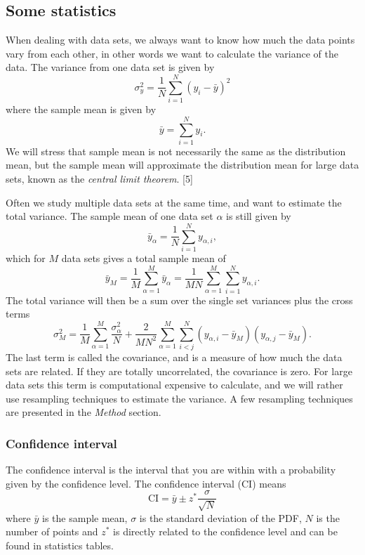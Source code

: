 \subsection{Some statistics} \label{sec:statistics}
When dealing with data sets, we always want to know how much the data points vary from each other, in other words we want to calculate the variance of the data. The variance from one data set is given by 
\begin{equation}
\sigma_y^2=\frac{1}{N}\sum_{i=1}^N(y_i-\bar{y})^2
\end{equation}
where the sample mean is given by
\begin{equation}
\bar{y}=\sum_{i=1}^Ny_i.
\end{equation}
We will stress that sample mean is not necessarily the same as the distribution mean, but the sample mean will approximate the distribution mean for large data sets, known as the \textit{central limit theorem}. [5]

Often we study multiple data sets at the same time, and want to estimate the total variance. The sample mean of one data set $\alpha$ is still given by
\begin{equation}
\bar{y}_{\alpha}=\frac{1}{N}\sum_{i=1}^Ny_{\alpha,i},
\end{equation}
which for $M$ data sets gives a total sample mean of
\begin{equation}
\bar{y}_M=\frac{1}{M}\sum_{\alpha=1}^M\bar{y}_{\alpha}=\frac{1}{MN}\sum_{\alpha=1}^M\sum_{i=1}^Ny_{\alpha,i}.
\end{equation}
The total variance will then be a sum over the single set variances plus the cross terms
\begin{equation}
\sigma_M^2=\frac{1}{M}\sum_{\alpha=1}^M\frac{\sigma_{\alpha}^2}{N}+\frac{2}{MN^2}\sum_{\alpha=1}^M\sum_{i<j}^N(y_{\alpha,i}-\bar{y}_M)(y_{\alpha,j}-\bar{y}_M).
\end{equation}
The last term is called the covariance, and is a measure of how much the data sets are related. If they are totally uncorrelated, the covariance is zero. For large data sets this term is computational expensive to calculate, and we will rather use resampling techniques to estimate the variance. A few resampling techniques are presented in the \textit{Method} section.

\subsubsection{Confidence interval} \label{sec:confidence}
The confidence interval is the interval that you are within with a probability given by the confidence level. The confidence interval (CI) means
\begin{equation}
\text{CI}=\bar{y}\pm z^*\frac{\sigma}{\sqrt{N}}
\end{equation}
where $\bar{y}$ is the sample mean, $\sigma$ is the standard deviation of the PDF, $N$ is the number of points and $z^*$ is directly related to the confidence level and can be found in statistics tables. 

